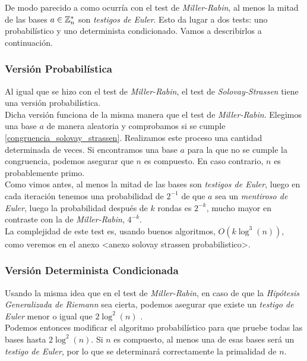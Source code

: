 De modo parecido a como ocurría con el test de \textit{Miller-Rabin}, al menos la mitad de las bases $a \in \mathbb{Z}_n^*$ son \textit{testigos de Euler}. Esto da lugar a dos tests: uno probabilístico y uno determinista condicionado. Vamos a describirlos a continuación.

\subsubsection{Versión Probabilística}

Al igual que se hizo con el test de \textit{Miller-Rabin}, el test de \textit{Solovay-Strassen} tiene una versión probabilística.\\

Dicha versión funciona de la misma manera que el test de \textit{Miller-Rabin}. Elegimos una base $a$ de manera aleatoria y comprobamos si se cumple \eqref{congruencia_solovay_strassen}. Realizamos este proceso una cantidad determinada de veces. Si encontramos una base $a$ para la que no se cumple la congruencia, podemos asegurar que $n$ es compuesto. En caso contrario, $n$ es probablemente primo.\\

Como vimos antes, al menos la mitad de las bases son \textit{testigos de Euler}, luego en cada iteración tenemos una probabilidad de $2^{-1}$ de que $a$ sea un \textit{mentiroso de Euler}, luego la probabilidad después de $k$ rondas es $2^{-k}$, mucho mayor en contraste con la de \textit{Miller-Rabin}, $4^{-k}$.\\

La complejidad de este test es, usando buenos algoritmos, $O(k\log^3(n))$, como veremos en el anexo <anexo solovay strassen probabilistico>.

\subsubsection{Versión Determinista Condicionada}

Usando la misma idea que en el test de \textit{Miller-Rabin}, en caso de que la \textit{Hipótesis Generalizada de Riemann} sea cierta, podemos asegurar que existe un \textit{testigo de Euler} menor o igual que $2\log^2(n)$ \cite{bach_1990}.\\

Podemos entonces modificar el algoritmo probabilístico para que pruebe todas las bases hasta $2\log^2(n)$. Si $n$ es compuesto, al menos una de esas bases será un \textit{testigo de Euler}, por lo que se determinará correctamente la primalidad de $n$.

\endinput
